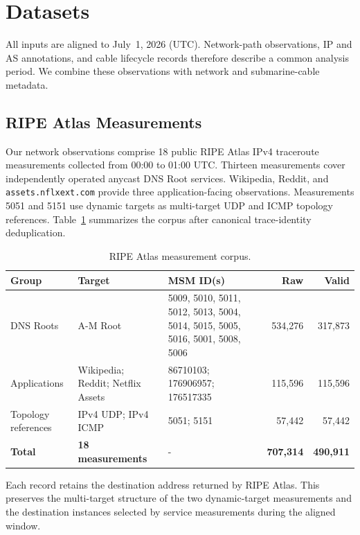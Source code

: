 \section{Datasets}
\label{sec:datasets}

All inputs are aligned to July~1, 2026 (UTC). Network-path observations,
IP and AS annotations, and cable lifecycle records therefore describe a
common analysis period. We combine these observations with network and
submarine-cable metadata.

\subsection{RIPE Atlas Measurements}
\label{subsec:atlas_corpus}

Our network observations comprise 18 public RIPE Atlas IPv4 traceroute
measurements collected from 00:00 to 01:00 UTC. Thirteen measurements cover
independently operated anycast DNS Root services. Wikipedia, Reddit, and
\texttt{assets.nflxext.com} provide three application-facing observations.
Measurements 5051 and 5151 use dynamic targets as multi-target UDP and ICMP
topology references. Table~\ref{tab:atlas_measurements} summarizes the corpus
after canonical trace-identity deduplication.

\begin{table}[ht]
  \centering
  \caption{RIPE Atlas measurement corpus.}
  \label{tab:atlas_measurements}
  \footnotesize
  \setlength{\tabcolsep}{4.2pt}
  \begin{tabular}{p{}p{}p{}rr}
    \toprule
    Group & Target & MSM ID(s) & Raw & Valid \\
    \midrule
    DNS Roots & A-M Root
      & 5009, 5010, 5011, 5012, 5013, 5004, 5014, 5015, 5005, 5016,
        5001, 5008, 5006
      & 534,276 & 317,873 \\
    Applications & Wikipedia; Reddit; Netflix Assets
      & 86710103; 176906957; 176517335
      & 115,596 & 115,596 \\
    Topology references & IPv4 UDP; IPv4 ICMP
      & 5051; 5151
      & 57,442 & 57,442 \\
    \midrule
    \textbf{Total} & \textbf{18 measurements} & -
      & \textbf{707,314} & \textbf{490,911} \\
    \bottomrule
  \end{tabular}
\end{table}

Each record retains the destination address returned by RIPE Atlas. This
preserves the multi-target structure of the two dynamic-target measurements
and the destination instances selected by service measurements during the
aligned window.

